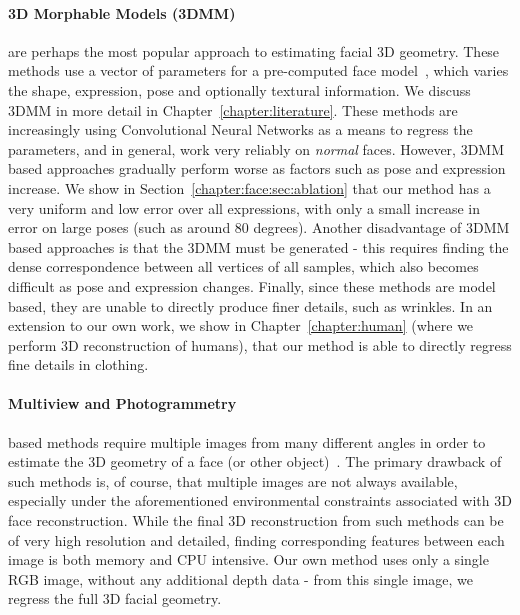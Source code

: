 \paragraph{3D Morphable Models (3DMM)} are perhaps the most popular
approach to estimating facial 3D geometry. These methods use a vector
of parameters for a pre-computed face
model~\cite{jourabloo2016large,huber2016multiresolution,zhu2016face,liu2016joint},
which varies the shape, expression, pose and optionally textural
information. We discuss 3DMM in more detail in
Chapter~\ref{chapter:literature}. These methods are increasingly using
Convolutional Neural Networks as a means to regress the parameters,
and in general, work very reliably on \textit{normal} faces. However,
3DMM based approaches gradually perform worse as factors such as pose
and expression increase. We show in
Section~\ref{chapter:face:sec:ablation} that our method has a very
uniform and low error over all expressions, with only a small increase
in error on large poses (such as around 80 degrees). Another
disadvantage of 3DMM based approaches is that the 3DMM must be
generated - this requires finding the dense correspondence between all
vertices of all samples, which also becomes difficult as pose and
expression changes. Finally, since these methods are model based, they
are unable to directly produce finer details, such as wrinkles. In an
extension to our own work, we show in Chapter~\ref{chapter:human}
(where we perform 3D reconstruction of humans), that our method is
able to directly regress fine details in clothing.

\paragraph{Multiview and Photogrammetry} based methods require
multiple images from many different angles in order to estimate the 3D
geometry of a face (or other
object)~\cite{dou2018multi,dai2018coarse,Piotraschke_2016_CVPR,mayo20093d}. The
primary drawback of such methods is, of course, that multiple images
are not always available, especially under the aforementioned
environmental constraints associated with 3D face
reconstruction. While the final 3D reconstruction from such methods
can be of very high resolution and detailed, finding corresponding
features between each image is both memory and CPU intensive. Our own
method uses only a single RGB image, without any additional depth data
- from this single image, we regress the full 3D facial geometry.

